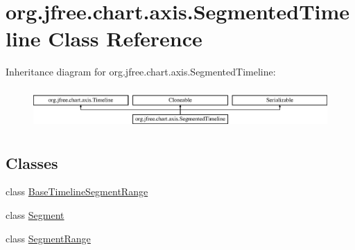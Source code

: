 \hypertarget{classorg_1_1jfree_1_1chart_1_1axis_1_1_segmented_timeline}{}\section{org.\+jfree.\+chart.\+axis.\+Segmented\+Timeline Class Reference}
\label{classorg_1_1jfree_1_1chart_1_1axis_1_1_segmented_timeline}
Inheritance diagram for org.\+jfree.\+chart.\+axis.\+Segmented\+Timeline\+:\begin{figure}[H]
\begin{center}
\leavevmode
\includegraphics[height=1.555556cm]{classorg_1_1jfree_1_1chart_1_1axis_1_1_segmented_timeline}
\end{center}
\end{figure}
\subsection*{Classes}
\begin{DoxyCompactItemize}
\item 
class \mbox{\hyperlink{classorg_1_1jfree_1_1chart_1_1axis_1_1_segmented_timeline_1_1_base_timeline_segment_range}{Base\+Timeline\+Segment\+Range}}
\item 
class \mbox{\hyperlink{classorg_1_1jfree_1_1chart_1_1axis_1_1_segmented_timeline_1_1_segment}{Segment}}
\item 
class \mbox{\hyperlink{classorg_1_1jfree_1_1chart_1_1axis_1_1_segmented_timeline_1_1_segment_range}{Segment\+Range}}
\end{DoxyCompactItemize}
